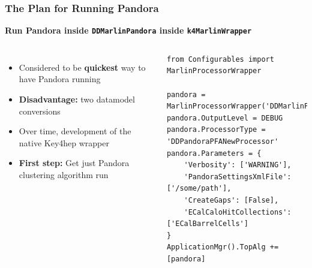 \documentclass[aspectratio=169]{beamer}
\newcommand{\bluetext}[1]{%
  \textcolor{myBlue}{#1}
}
\newcommand{\redtext}[1]{%
  \textcolor{myRed}{#1}
}
\begin{document}
\begin{frame}[fragile]
  \frametitle{The Plan for Running Pandora}

  \begin{center}
  \bluetext{\bf Run Pandora inside \texttt{DDMarlinPandora} inside
            \texttt{k4MarlinWrapper}}
  \end{center}

  \begin{columns}[c]

    \begin{itemize}
      \item Considered to be \bluetext{\bf quickest} way to have Pandora running
      \item \redtext{\bf Disadvantage:} two datamodel conversions
      \item Over time, development of the native Key4hep wrapper
      \item \bluetext{\bf First step:} Get just Pandora clustering algorithm run
    \end{itemize}


    \tiny
    \begin{verbatim}
from Configurables import MarlinProcessorWrapper

pandora = MarlinProcessorWrapper('DDMarlinPandora')
pandora.OutputLevel = DEBUG
pandora.ProcessorType = 'DDPandoraPFANewProcessor'
pandora.Parameters = {
    'Verbosity': ['WARNING'],
    'PandoraSettingsXmlFile': ['/some/path'],
    'CreateGaps': [False],
    'ECalCaloHitCollections': ['ECalBarrelCells']
}
ApplicationMgr().TopAlg += [pandora]
\end{verbatim}
  \end{columns}
\end{frame}
\end{document}
